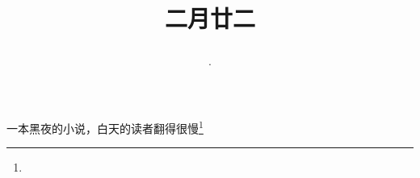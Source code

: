 \title{\date[d=31,m=3,y=2024][year:cn-y,年,month:cn,day:cn,日,·,weekday]·二月廿二 }
一本黑夜的小说，白天的读者翻得很慢\footnote{ }

